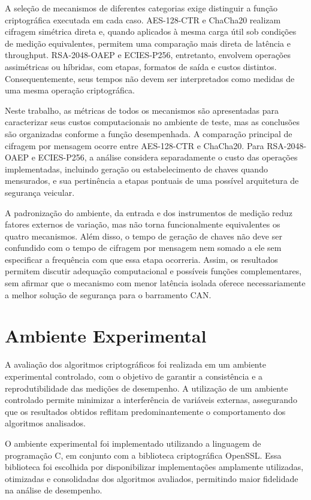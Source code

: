 A seleção de mecanismos de diferentes categorias exige distinguir a função criptográfica executada em cada caso. AES-128-CTR e ChaCha20 realizam cifragem simétrica direta e, quando aplicados à mesma carga útil sob condições de medição equivalentes, permitem uma comparação mais direta de latência e throughput. RSA-2048-OAEP e ECIES-P256, entretanto, envolvem operações assimétricas ou híbridas, com etapas, formatos de saída e custos distintos. Consequentemente, seus tempos não devem ser interpretados como medidas de uma mesma operação criptográfica.

Neste trabalho, as métricas de todos os mecanismos são apresentadas para caracterizar seus custos computacionais no ambiente de teste, mas as conclusões são organizadas conforme a função desempenhada. A comparação principal de cifragem por mensagem ocorre entre AES-128-CTR e ChaCha20. Para RSA-2048-OAEP e ECIES-P256, a análise considera separadamente o custo das operações implementadas, incluindo geração ou estabelecimento de chaves quando mensurados, e sua pertinência a etapas pontuais de uma possível arquitetura de segurança veicular.

A padronização do ambiente, da entrada e dos instrumentos de medição reduz fatores externos de variação, mas não torna funcionalmente equivalentes os quatro mecanismos. Além disso, o tempo de geração de chaves não deve ser confundido com o tempo de cifragem por mensagem nem somado a ele sem especificar a frequência com que essa etapa ocorreria. Assim, os resultados permitem discutir adequação computacional e possíveis funções complementares, sem afirmar que o mecanismo com menor latência isolada oferece necessariamente a melhor solução de segurança para o barramento CAN.

\section{Ambiente Experimental}

A avaliação dos algoritmos criptográficos foi realizada em um ambiente experimental controlado, com o objetivo de garantir a consistência e a reprodutibilidade das medições de desempenho. A utilização de um ambiente controlado permite minimizar a interferência de variáveis externas, assegurando que os resultados obtidos reflitam predominantemente o comportamento dos algoritmos analisados.

O ambiente experimental foi implementado utilizando a linguagem de programação C, em conjunto com a biblioteca criptográfica OpenSSL. Essa biblioteca foi escolhida por disponibilizar implementações amplamente utilizadas, otimizadas e consolidadas dos algoritmos avaliados, permitindo maior fidelidade na análise de desempenho.

